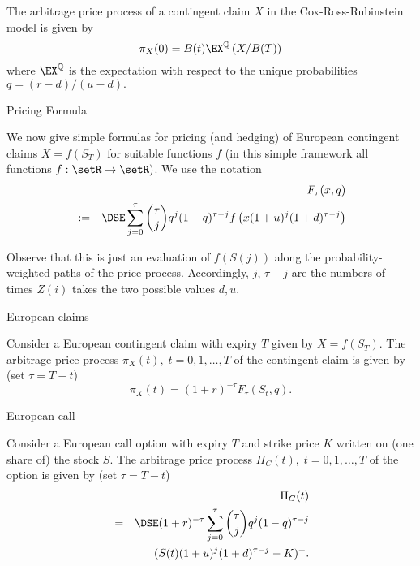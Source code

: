 	The arbitrage price process of a contingent claim $X$ in the
Cox-Ross-Rubinstein model is given by
$$
\pi_X(0) = B(t) \EX^\mathbb{Q}\left( X/B(T)\right)
$$
where $\EX^\mathbb{Q}$ is the expectation with respect to the
unique probabilities
$q= (r-d)/(u-d).$


{Pricing Formula}


	We now give simple formulas for pricing (and hedging) of European
contingent claims $X=f(S_T)$ for suitable functions $f$ (in this
simple framework all functions $f:\setR \rightarrow \setR)$. We
use the notation
\begin{eqnarray}\label{BinomialF}
&& F_\tau(x,q)\\\nonumber
&:=&\DSE \sum_{j=0}^\tau {\tau \choose j} q^j (1-q)^{\tau-j}
f\left(x(1+u)^j(1+d)^{\tau-j}\right)
\end{eqnarray}

	Observe that this is just an evaluation of $f(S(j))$ along the
probability-weighted paths of the price process. Accordingly, $j$,
$\tau-j$ are the numbers of times $Z(i)$ takes the two possible
values $d, u$.


{European claims}


	Consider a European contingent claim with expiry $T$ given by
$X=f(S_T)$. The arbitrage price process $\pi_X(t), \; t=0, 1,
\ldots, T$ of the contingent claim is given by (set $\tau=T-t$)
\begin{equation}\label{crrcontclaimprice}
\pi_X(t) = (1+r)^{-\tau} F_\tau(S_t,q).
\end{equation}


{European call}


	Consider a European call option with expiry $T$ and strike price
$K$ written on (one share of) the stock $S$. The arbitrage price
process $\Pi_C(t), \; t=0, 1, \ldots, T$ of the option is given by
(set $\tau=T-t$)
\begin{eqnarray}\label{crrcallprice}
&& \Pi_C(t)\\\nonumber
&=&\DSE (1+r)^{-\tau} \sum_{j=0}^{\tau} {{\tau} \choose j}
{q}^j (1 - q)^{\tau-j}\\\nonumber
&&(S(t) (1+u)^j (1+d)^{\tau-j} - K)^+.
\end{eqnarray}

